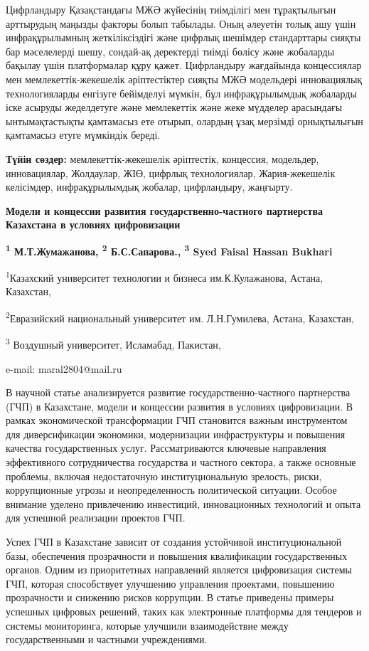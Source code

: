Цифрландыру Қазақстандағы МЖӘ жүйесінің тиімділігі мен тұрақтылығын
арттырудың маңызды факторы болып табылады. Оның әлеуетін толық ашу үшін
инфрақұрылымның жеткіліксіздігі және цифрлық шешімдер стандарттары
сияқты бар мәселелерді шешу, сондай-ақ деректерді тиімді бөлісу және
жобаларды бақылау үшін платформалар құру қажет. Цифрландыру жағдайында
концессиялар мен мемлекеттік-жекешелік әріптестіктер сияқты МЖӘ
модельдері инновациялық технологияларды енгізуге бейімделуі мүмкін, бұл
инфрақұрылымдық жобаларды іске асыруды жеделдетуге және мемлекеттік және
жеке мүдделер арасындағы ынтымақтастықты қамтамасыз ете отырып, олардың
ұзақ мерзімді орнықтылығын қамтамасыз етуге мүмкіндік береді.

{\bfseries Түйін сөздер:} мемлекеттік-жекешелік әріптестік, концессия,
модельдер, инновациялар, Жолдаулар, ЖІӨ, цифрлық технологиялар,
Жария-жекешелік келісімдер, инфрақұрылымдық жобалар, цифрландыру,
жаңғырту.

{\bfseries Модели и концессии развития государственно-частного партнерства
Казахстана в условиях цифровизации}

{\bfseries \textsuperscript{1} М.Т.Жумажанова\textsuperscript{\envelope },
\textsuperscript{2} Б.С.Сапарова., \textsuperscript{3} Syed Faisal
Hassan Bukhari}

\textsuperscript{1}Казахский университет технологии и бизнеса
им.К.Кулажанова, Астана, Казахстан,

\textsuperscript{2}Евразийский национальный университет им.
Л.Н.Гумилева, Астана, Казахстан,

\textsuperscript{3} Воздушный университет, Исламабад, Пакистан,

e-mail: maral2804@mail.ru

В научной статье анализируется развитие государственно-частного
партнерства (ГЧП) в Казахстане, модели и концессии развития в условиях
цифровизации. В рамках экономической трансформации ГЧП становится важным
инструментом для диверсификации экономики, модернизации инфраструктуры и
повышения качества государственных услуг. Рассматриваются ключевые
направления эффективного сотрудничества государства и частного сектора,
а также основные проблемы, включая недостаточную институциональную
зрелость, риски, коррупционные угрозы и неопределенность политической
ситуации. Особое внимание уделено привлечению инвестиций, инновационных
технологий и опыта для успешной реализации проектов ГЧП.

Успех ГЧП в Казахстане зависит от создания устойчивой институциональной
базы, обеспечения прозрачности и повышения квалификации государственных
органов. Одним из приоритетных направлений является цифровизация системы
ГЧП, которая способствует улучшению управления проектами, повышению
прозрачности и снижению рисков коррупции. В статье приведены примеры
успешных цифровых решений, таких как электронные платформы для тендеров
и системы мониторинга, которые улучшили взаимодействие между
государственными и частными учреждениями.


